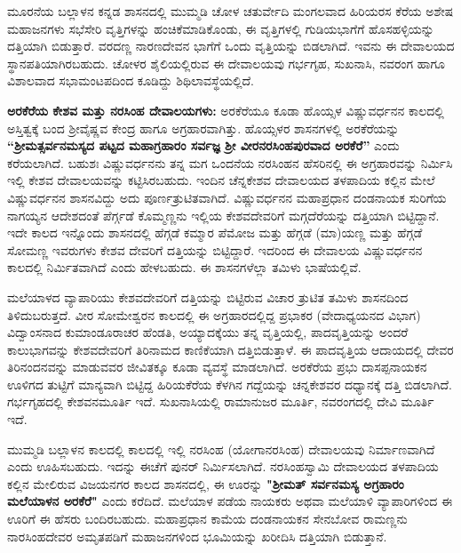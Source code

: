 \vskip 3pt

ಮೂರನೆಯ ಬಲ್ಲಾಳನ ಕನ್ನಡ ಶಾಸನದಲ್ಲಿ ಮುಮ್ಮಡಿ ಚೋಳ ಚತುರ್ವೇದಿ ಮಂಗಲವಾದ ಹಿರಿಯರಸ ಕೆರೆಯ ಅಶೇಷ ಮಹಾಜನಗಳು ಸಭೆಸೇರಿ ವೃತ್ತಿಗಳನ್ನು ಹಂಚಿಕೆಮಾಡಿಕೊಂಡು, ಈ ವೃತ್ತಿಗಳಲ್ಲಿ ಗುಡಿಯಭಾಗೆಗೆ ಹೊಸಹಳ್ಳಿಯನ್ನು ದತ್ತಿಯಾಗಿ ಬಿಡುತ್ತಾರೆ. ವರದಣ್ಣ ನಾರಣದೇವನ ಭಾಗೆಗೆ ಒಂದು ವೃತ್ತಿಯನ್ನು ಬಿಡಲಾಗಿದೆ. ಇವನು ಈ ದೇವಾಲಯದ ಸ್ಥಾನಪತಿಯಾಗಿರಬಹುದು. ಚೋಳರ ಶೈಲಿಯಲ್ಲಿರುವ ಈ ದೇವಾಲಯವು ಗರ್ಭಗೃಹ, ಸುಖನಾಸಿ, ನವರಂಗ ಹಾಗೂ ವಿಶಾಲವಾದ ಸಭಾಮಂಟಪದಿಂದ ಕೂಡಿದ್ದು ಶಿಥಿಲಾವಸ್ಥೆಯಲ್ಲಿದೆ.

\textbf{ಅರಕೆರೆಯ ಕೇಶವ ಮತ್ತು ನರಸಿಂಹ ದೇವಾಲಯಗಳು:} ಅರಕೆರೆಯೂ ಕೂಡಾ ಹೊಯ್ಸಳ ವಿಷ್ಣುವರ್ಧನನ ಕಾಲದಲ್ಲಿ ಅಸ್ತಿತ್ವಕ್ಕೆ ಬಂದ ಶ‍್ರೀವೈಷ್ಣವ ಕೇಂದ್ರ ಹಾಗೂ ಅಗ್ರಹಾರವಾಗಿತ್ತು. ಹೊಯ್ಸಳರ ಶಾಸನಗಳಲ್ಲಿ ಅರಕೆರೆಯನ್ನು \textbf{“ಶ‍್ರೀಮತ್ಸರ್ವನಮಸ್ಯದ ಪಟ್ಟದ ಮಹಾಗ್ರಹಾರಂ ಸರ್ವಜ್ಞ ಶ‍್ರೀ ವೀರನರಸಿಂಹಪುರವಾದ ಅರಕೆರೆ”} ಎಂದು ಕರೆಯಲಾಗಿದೆ. ಬಹುಶಃ ವಿಷ್ಣುವರ್ಧನನು ತನ್ನ ಮಗ ಒಂದನೆಯ ನರಸಿಂಹನ ಹೆಸರಿನಲ್ಲಿ ಈ ಅಗ್ರಹಾರವನ್ನು ನಿರ್ಮಿಸಿ ಇಲ್ಲಿ ಕೇಶವ ದೇವಾಲಯವನ್ನು ಕಟ್ಟಿಸಿರಬಹುದು. ಇಂದಿನ ಚೆನ್ನಕೇಶವ ದೇವಾಲಯದ ತಳಪಾದಿಯ ಕಲ್ಲಿನ ಮೇಲೆ ವಿಷ್ಣುವರ್ಧನನ ಶಾಸನವಿದ್ದು ಅದು ಪೂರ್ಣತ್ರುಟಿತವಾಗಿದೆ. ವಿಷ್ಣುವರ್ಧನನ ಮಹಾಪ್ರಧಾನ ದಂಡನಾಯಕ ಸುರಿಗೆಯ ನಾಗಯ್ಯನ ಆದೇಶದಂತೆ ಪೆರ್ಗ್ಗಡೆ ಕೊಮ್ಮಣ್ಣನು ಇಲ್ಲಿಯ ಕೇಶವದೇವರಿಗೆ ಮಗ್ಗದೆರೆಯನ್ನು ದತ್ತಿಯಾಗಿ ಬಿಟ್ಟಿದ್ದಾನೆ. ಇದೇ ಕಾಲದ ಇನ್ನೊಂದು ಶಾಸನದಲ್ಲಿ ಹೆಗ್ಗಡೆ ಕಮ್ಮಾರ ಪೆಮೋಜ ಮತ್ತು ಹೆಗ್ಗಡೆ (ಮಾ)ಯಣ್ಣ ಮತ್ತು ಹೆಗ್ಗಡೆ ಸೋಮಣ್ಣ ಇವರುಗಳು ಕೇಶವ ದೇವರಿಗೆ ದತ್ತಿಯನ್ನು ಬಿಟ್ಟಿದ್ದಾರೆ. ಇದರಿಂದ ಈ ದೇವಾಲಯ ವಿಷ್ಣುವರ್ಧನನ ಕಾಲದಲ್ಲಿ ನಿರ್ಮಿತವಾಗಿದೆ ಎಂದು ಹೇಳಬಹುದು. ಈ ಶಾಸನಗಳೆಲ್ಲಾ ತಮಿಳು ಭಾಷೆಯಲ್ಲಿವೆ.

ಮಲೆಯಾಳದ ವ್ಯಾಪಾರಿಯು ಕೇಶವದೇವರಿಗೆ ದತ್ತಿಯನ್ನು ಬಿಟ್ಟಿರುವ ವಿಚಾರ ತ್ರುಟಿತ ತಮಿಳು ಶಾಸನದಿಂದ ತಿಳಿದುಬರುತ್ತದೆ. ವೀರ ಸೋಮೇಶ್ವರನ ಕಾಲದಲ್ಲಿ ಈ ಅಗ್ರಹಾರದಲ್ಲಿದ್ದ ಪ್ರಭಾಕರ (ವೇದಾಧ್ಯಯನದ ವಿಭಾಗ) ವಿದ್ವಾಂಸನಾದ ಕುಮಾಂಡೂರಾಚರ ಹೆಂಡತಿ, ಅಯ್ಯಾದಕ್ಕೆಯು ತನ್ನ ವೃತ್ತಿಯಲ್ಲಿ, ಪಾದವೃತ್ತಿಯನ್ನು ಅಂದರೆ ಕಾಲುಭಾಗವನ್ನು ಕೇಶವದೇವರಿಗೆ ತಿರಿನಾಮದ ಕಾಣಿಕೆಯಾಗಿ ದತ್ತಿಬಿಡುತ್ತಾಳೆ. ಈ ಪಾದವೃತ್ತಿಯ ಆದಾಯದಲ್ಲಿ ದೇವರ ತಿರಿನಂದನವನ್ನು ಮಾಡುವವರ ಜೀವಿತಕ್ಕೂ ಕೂಡಾ ವ್ಯವಸ್ಥೆ ಮಾಡಲಾಗಿದೆ. ಅರಕೆರೆಯ ಪ್ರಭು ದಾಸಪ್ಪನಾಯಕನ ಊಳಿಗದ ತುಟ್ಟಿಗೆ ಮಾನ್ಯವಾಗಿ ಬಿಟ್ಟಿದ್ದ ಹಿರಿಯಕೆರೆಯ ಕೆಳಗಿನ ಗದ್ದೆಯನ್ನು ಚನ್ನಕೇಶವರ ದಧ್ಯಾನಕ್ಕೆ ದತ್ತಿ ಬಿಡಲಾಗಿದೆ. ಗರ್ಭಗೃಹದಲ್ಲಿ ಕೇಶವನಮೂರ್ತಿ ಇದೆ. ಸುಖನಾಸಿಯಲ್ಲಿ ರಾಮಾನುಜರ ಮೂರ್ತಿ, ನವರಂಗದಲ್ಲಿ ದೇವಿ ಮೂರ್ತಿ ಇದೆ.

ಮುಮ್ಮಡಿ ಬಲ್ಲಾಳನ ಕಾಲದಲ್ಲಿ ಕಾಲದಲ್ಲಿ ಇಲ್ಲಿ ನರಸಿಂಹ (ಯೋಗಾನರಸಿಂಹ) ದೇವಾಲಯವು ನಿರ್ಮಾಣವಾಗಿದೆ ಎಂದು ಊಹಿಸಬಹುದು. ಇದನ್ನು ಈಚೆಗೆ ಪುನರ್​ ನಿರ್ಮಿಸಲಾಗಿದೆ. ನರಸಿಂಹಸ್ವಾಮಿ ದೇವಾಲಯದ ತಳಪಾದಿಯ ಕಲ್ಲಿನ ಮೇಲಿರುವ ವಿಜಯನಗರ ಕಾಲದ ಶಾಸನದಲ್ಲಿ, ಈ ಊರನ್ನು \textbf{"ಶ‍್ರೀಮತ್​ ಸರ್ವನಮಸ್ಯ ಅಗ್ರಹಾರಂ ಮಲೆಯಾಳನ ಅರಕೆರೆ"} ಎಂದು ಕರೆದಿದೆ. ಮಲೆಯಾಳ ಪಡೆಯ ನಾಯಕರು ಅಥವಾ ಮಲೆಯಾಳಿ ವ್ಯಾಪಾರಿಗಳಿಂದ ಈ ಊರಿಗೆ ಈ ಹೆಸರು ಬಂದಿರಬಹುದು. ಮಹಾಪ್ರಧಾನ ಕಾಮೆಯ ದಂಡನಾಯಕನ ಸೇನಬೋವ ರಾಮಣ್ಣನು ನಾರಸಿಂಹದೇವರ ಅಮೃತಪಡಿಗೆ ಮಹಾಜನಗಳಿಂದ ಭೂಮಿಯನ್ನು ಖರೀದಿಸಿ ದತ್ತಿಯಾಗಿ ಬಿಡುತ್ತಾನೆ.

